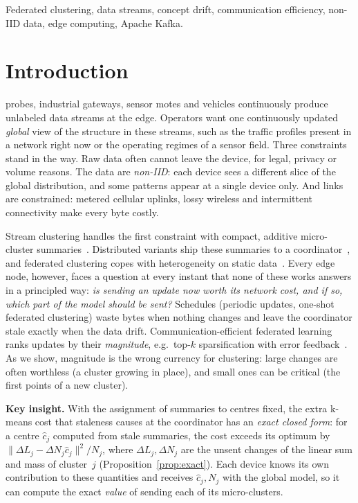 \documentclass[journal]{IEEEtran}
\begin{document}
\begin{IEEEkeywords}
Federated clustering, data streams, concept drift, communication efficiency, non-IID data, edge computing, Apache Kafka.
\end{IEEEkeywords}

\section{Introduction}
 probes, industrial gateways, sensor motes and vehicles continuously produce unlabeled data streams at the edge. Operators want one continuously updated \emph{global} view of the structure in these streams, such as the traffic profiles present in a network right now or the operating regimes of a sensor field. Three constraints stand in the way. Raw data often cannot leave the device, for legal, privacy or volume reasons. The data are \emph{non-IID}: each device sees a different slice of the global distribution, and some patterns appear at a single device only. And links are constrained: metered cellular uplinks, lossy wireless and intermittent connectivity make every byte costly.

Stream clustering handles the first constraint with compact, additive micro-cluster summaries~\cite{zhang1996birch,aggarwal2003clustream,cao2006denstream}. Distributed variants ship these summaries to a coordinator~\cite{cormode2007divide,gama2011dgclust,tran2013communication}, and federated clustering copes with heterogeneity on static data~\cite{dennis2021kfed,zhang2025afcl}. Every edge node, however, faces a question at every instant that none of these works answers in a principled way: \emph{is sending an update now worth its network cost, and if so, which part of the model should be sent?} Schedules (periodic updates, one-shot federated clustering) waste bytes when nothing changes and leave the coordinator stale exactly when the data drift. Communication-efficient federated learning ranks updates by their \emph{magnitude}, e.g.\ top-$k$ sparsification with error feedback~\cite{aji2017sparse,stich2018sparsified,karimireddy2019ef}. As we show, magnitude is the wrong currency for clustering: large changes are often worthless (a cluster growing in place), and small ones can be critical (the first points of a new cluster).

\textbf{Key insight.} With the assignment of summaries to centres fixed, the extra k-means cost that staleness causes at the coordinator has an \emph{exact closed form}: for a centre $\hat c_j$ computed from stale summaries, the cost exceeds its optimum by $\|\Delta L_j-\Delta N_j\hat c_j\|^2/N_j$, where $\Delta L_j,\Delta N_j$ are the unsent changes of the linear sum and mass of cluster~$j$ (Proposition~\ref{prop:exact}). Each device knows its own contribution to these quantities and receives $\hat c_j,N_j$ with the global model, so it can compute the exact \emph{value} of sending each of its micro-clusters.
\end{document}
